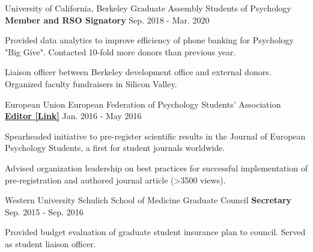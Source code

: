 

\begin{cventries}

  \cventry 
    {University of California, Berkeley} %
    {Graduate Assembly Students of Psychology}
    {\textbf{Member and RSO Signatory}} %
    {Sep. 2018 - Mar. 2020} %
    {
      \begin{cvitems} %
        \item {Provided data analytics to improve efficiency of phone banking for Psychology "Big Give". Contacted 10-fold more donors than previous year.}
        \item {Liaison officer between Berkeley development office and external donors. Organized faculty fundraisers in Silicon Valley.}
      \end{cvitems}
    }
    
  \cventry
    {European Union}
    {European Federation of Psychology Students' Association} %
    {\href{https://jeps.efpsa.org/articles/10.5334/jeps.401/}{\textbf{Editor [Link]}}} %
    {Jan. 2016 - May 2016} %
    {
      \begin{cvitems} %
        \item {Spearheaded initiative to pre-register scientific results in the Journal of European Psychology Students, a first for student journals worldwide.}
        \item {Advised organization leadership on best practices for successful implementation of pre-registration and authored journal article (>3500 views).}
      \end{cvitems}
    }
    
  \cventry
  	{Western University} %
  	{Schulich School of Medicine Graduate Council} %
    {\textbf{Secretary}} %
    {Sep. 2015 - Sep. 2016} %
    {
      \begin{cvitems} %
        \item {Provided budget evaluation of graduate student insurance plan to council. Served as student liaison officer.}
      \end{cvitems}
    }
    

\end{cventries}
